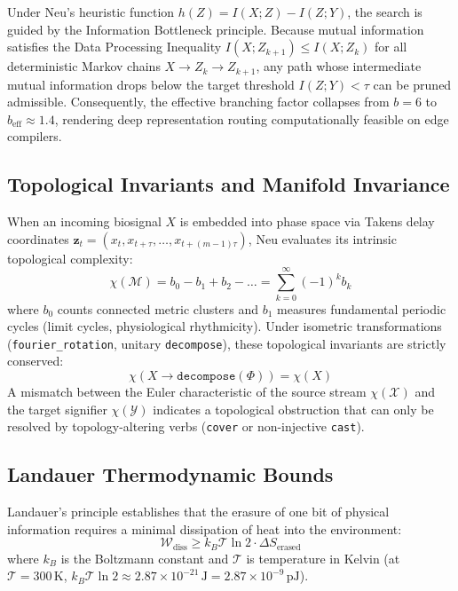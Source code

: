 \documentclass[11pt]{article}
\begin{document}
Under Neu's heuristic function $h(Z) = I(X; Z) - I(Z; Y)$, the search is guided by the Information Bottleneck principle. Because mutual information satisfies the Data Processing Inequality $I(X; Z_{k+1}) \le I(X; Z_k)$ for all deterministic Markov chains $X \to Z_k \to Z_{k+1}$, any path whose intermediate mutual information drops below the target threshold $I(Z; Y) < \tau$ can be pruned admissible. Consequently, the effective branching factor collapses from $b=6$ to $b_{\text{eff}} \approx 1.4$, rendering deep representation routing computationally feasible on edge compilers.

\subsection{Topological Invariants and Manifold Invariance}
When an incoming biosignal $X$ is embedded into phase space via Takens delay coordinates $\mathbf{z}_t = (x_t, x_{t+\tau}, \dots, x_{t+(m-1)\tau})$, Neu evaluates its intrinsic topological complexity:
\begin{equation}
\chi(\mathcal{M}) = b_0 - b_1 + b_2 - \dots = \sum_{k=0}^{\infty} (-1)^k b_k
\end{equation}
where $b_0$ counts connected metric clusters and $b_1$ measures fundamental periodic cycles (limit cycles, physiological rhythmicity). Under isometric transformations (\texttt{fourier\_rotation}, unitary \texttt{decompose}), these topological invariants are strictly conserved:
\begin{equation}
\chi(X \to \texttt{decompose}(\Phi)) = \chi(X)
\end{equation}
A mismatch between the Euler characteristic of the source stream $\chi(\mathcal{X})$ and the target signifier $\chi(\mathcal{Y})$ indicates a topological obstruction that can only be resolved by topology-altering verbs (\texttt{cover} or non-injective \texttt{cast}).

\subsection{Landauer Thermodynamic Bounds}
Landauer's principle establishes that the erasure of one bit of physical information requires a minimal dissipation of heat into the environment:
\begin{equation}
\mathcal{W}_{\text{diss}} \ge k_B \mathcal{T} \ln 2 \cdot \Delta S_{\text{erased}}
\end{equation}
where $k_B$ is the Boltzmann constant and $\mathcal{T}$ is temperature in Kelvin (at $\mathcal{T} = 300\,\text{K}$, $k_B \mathcal{T} \ln 2 \approx 2.87 \times 10^{-21}\,\text{J} = 2.87 \times 10^{-9}\,\text{pJ}$).
\end{document}
